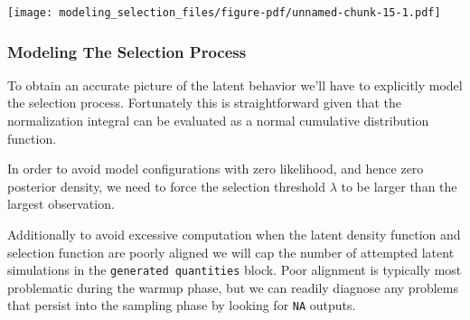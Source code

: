 \documentclass[
  letterpaper,
  DIV=11,
  numbers=noendperiod]{scrartcl}
\begin{document}
\texttt{[image: modeling\_selection\_files/figure-pdf/unnamed-chunk-15-1.pdf]}

\subsubsection{Modeling The Selection
Process}\label{modeling-the-selection-process}

To obtain an accurate picture of the latent behavior we'll have to
explicitly model the selection process. Fortunately this is
straightforward given that the normalization integral can be evaluated
as a normal cumulative distribution function.

In order to avoid model configurations with zero likelihood, and hence
zero posterior density, we need to force the selection threshold
\(\lambda\) to be larger than the largest observation.

Additionally to avoid excessive computation when the latent density
function and selection function are poorly aligned we will cap the
number of attempted latent simulations in the
\texttt{generated\ quantities} block. Poor alignment is typically most
problematic during the warmup phase, but we can readily diagnose any
problems that persist into the sampling phase by looking for \texttt{NA}
outputs.
\end{document}
